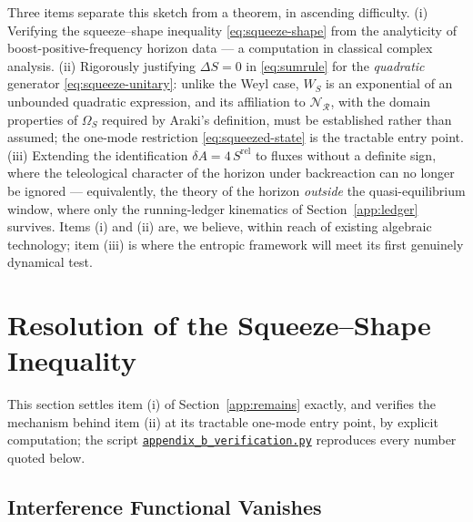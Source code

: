 \documentclass[11pt]{article}
\newcommand{\Srel}{S^{\mathrm{rel}}}
\begin{document}
Three items separate this sketch from a theorem, in ascending difficulty. (i) Verifying the squeeze--shape inequality \eqref{eq:squeeze-shape} from the analyticity of boost-positive-frequency horizon data --- a computation in classical complex analysis. (ii) Rigorously justifying $\Delta S = 0$ in \eqref{eq:sumrule} for the \emph{quadratic} generator \eqref{eq:squeeze-unitary}: unlike the Weyl case, $W_S$ is an exponential of an unbounded quadratic expression, and its affiliation to $\mathscr{N}_{\mathcal{R}}$, with the domain properties of $\Omega_S$ required by Araki's definition, must be established rather than assumed; the one-mode restriction \eqref{eq:squeezed-state} is the tractable entry point. (iii) Extending the identification $\delta A = 4\,\Srel$ to fluxes without a definite sign, where the teleological character of the horizon under backreaction can no longer be ignored \cite{Panella2025} --- equivalently, the theory of the horizon \emph{outside} the quasi-equilibrium window, where only the running-ledger kinematics of Section~\ref{app:ledger} survives. Items (i) and (ii) are, we believe, within reach of existing algebraic technology; item (iii) is where the entropic framework will meet its first genuinely dynamical test.



\section{Resolution of the Squeeze--Shape Inequality}
\label{app:numerics}

This section settles item (i) of Section~\ref{app:remains} exactly, and verifies the mechanism behind item (ii) at its tractable one-mode entry point, by explicit computation; the script \href{https://github.com/brentharts/NariaiRelativeEntropy/blob/main/appendix_b_verification.py}{\texttt{appendix\_b\_verification.py}} reproduces every number quoted below.

\subsection{Interference Functional Vanishes}
\label{app:exact}
\end{document}
